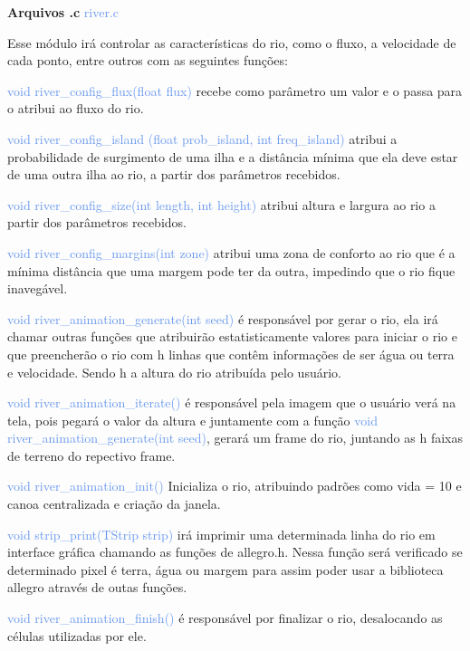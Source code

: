 \documentclass[a4paper,12pt]{article}
\begin{document}
{\Large \textcolor{NavyBlue}{ \textbf{Arquivos .c  }}}{\large \textcolor{CornflowerBlue}{  river.c}}
\bigskip

Esse módulo irá controlar as características do rio, como o fluxo, a velocidade de cada ponto, entre outros com as seguintes funções:

{\textcolor{CornflowerBlue}{void river\_config\_flux(float flux)}} recebe como parâmetro um valor e o passa para o atribui ao fluxo do rio.

{\textcolor{CornflowerBlue}{void river\_config\_island (float prob\_island, int freq\_island)}} atribui a probabilidade de surgimento de uma ilha e a distância mínima que ela deve estar de uma outra ilha ao rio, a partir dos parâmetros recebidos.

{\textcolor{CornflowerBlue}{void river\_config\_size(int length, int height)}} atribui altura e largura ao rio a partir dos parâmetros recebidos. 

{\textcolor{CornflowerBlue}{void river\_config\_margins(int zone)}} atribui uma zona de conforto ao rio que é a mínima distância que uma margem pode ter da outra, impedindo que o rio fique inavegável.

{\textcolor{CornflowerBlue}{void river\_animation\_generate(int seed)}} é responsável por gerar o rio, ela irá chamar outras funções que atribuirão estatisticamente valores para iniciar o rio e que preencherão o rio com h linhas
que contêm informações de ser água ou terra e velocidade. Sendo h a altura do rio atribuída pelo usuário.

{\textcolor{CornflowerBlue}{void river\_animation\_iterate()}} é responsável pela imagem que o usuário verá na tela, pois pegará o valor da altura e juntamente com a função {\textcolor{CornflowerBlue}{void river\_animation\_generate(int seed)}}, gerará um frame do rio, juntando as h faixas de terreno do repectivo frame.

{\textcolor{CornflowerBlue}{void river\_animation\_init()}} Inicializa o rio, atribuindo padrões como vida = 10 e canoa centralizada e criação da janela.

{\textcolor{CornflowerBlue}{void strip\_print(TStrip strip)}} irá imprimir uma determinada linha do rio em interface gráfica 
chamando as funções de allegro.h. Nessa função será verificado se determinado pixel é terra, água ou margem para assim poder
usar a biblioteca allegro através de outas funções.

{\textcolor{CornflowerBlue}{void river\_animation\_finish()}} é responsável por finalizar o rio, desalocando as células utilizadas por ele.
\end{document}
